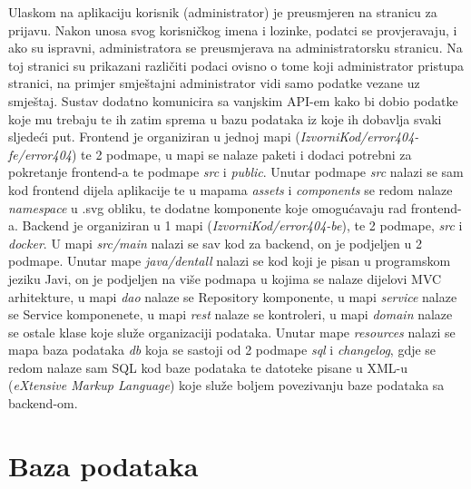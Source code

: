 \begin{itemize}
		Ulaskom na aplikaciju korisnik (administrator) je preusmjeren na stranicu za prijavu. Nakon unosa svog korisničkog imena i lozinke, podatci se provjeravaju, i ako su ispravni, administratora se  preusmjerava na administratorsku stranicu. Na toj stranici su prikazani različiti podaci ovisno o tome koji administrator pristupa stranici, na primjer smještajni administrator vidi samo podatke vezane uz smještaj. \newline Sustav dodatno komunicira sa vanjskim API-em kako bi dobio podatke koje mu trebaju te ih zatim sprema u bazu podataka iz koje ih dobavlja svaki sljedeći put. \newline Frontend je organiziran u jednoj mapi (\textit{IzvorniKod/error404-fe/error404}) te 2 podmape, u mapi se nalaze paketi i dodaci potrebni za pokretanje frontend-a te podmape \textit{src} i \textit{public}. Unutar podmape \textit{src} nalazi se sam kod frontend dijela aplikacije te u mapama \textit{assets} i \textit{components} se redom nalaze \textit{namespace} u .svg obliku, te dodatne komponente koje omogućavaju rad frontend-a. \newline Backend je organiziran u 1 mapi (\textit{IzvorniKod/error404-be}), te 2 podmape, \textit{src} i \textit{docker}. U mapi \textit{src/main} nalazi se sav kod za backend, on je podjeljen u 2 podmape. Unutar mape \textit{java/dentall} nalazi se kod koji je pisan u programskom jeziku Javi, on je podjeljen na više podmapa u kojima se nalaze dijelovi MVC arhitekture, u mapi \textit{dao} nalaze se Repository komponente, u mapi \textit{service} nalaze se Service komponenete, u mapi \textit{rest} nalaze se kontroleri, u mapi \textit{domain} nalaze se ostale klase koje služe organizaciji podataka. Unutar mape \textit{resources} nalazi se mapa baza podataka \textit{db} koja se sastoji od 2 podmape \textit{sql} i \textit{changelog}, gdje se redom nalaze sam SQL kod baze podataka te datoteke pisane u XML-u (\textit{eXtensive Markup Language}) koje služe boljem povezivanju baze podataka sa backend-om. 
		
		
	\end{itemize}
		\section{Baza podataka}
			
			
		
